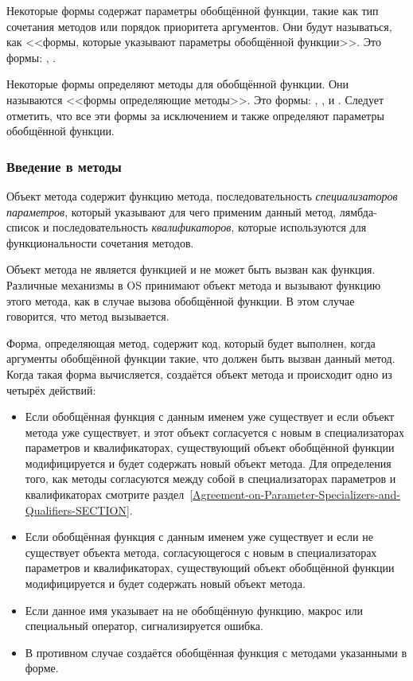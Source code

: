 Некоторые формы содержат параметры обобщённой функции, такие как тип сочетания
методов или порядок приоритета аргументов. Они будут называться, как <<формы,
которые указывают параметры обобщённой функции>>. Это формы: ,
.

Некоторые формы определяют методы для обобщённой функции. Они называются <<формы
определяющие методы>>. Это формы: , ,
 и . Следует отметить, что все эти формы за
исключением  и  также определяют параметры
обобщённой функции.

\subsubsection{Введение в методы}
\label{Introduction-to-Methods-SECTION}

Объект метода содержит функцию метода, последовательность \emph{специализаторов
  параметров}, который указывают для чего применим данный метод, лямбда-список и
последовательность \emph{квалификаторов}, которые используются для функциональности
сочетания методов.

Объект метода не является функцией и не может быть вызван как функция. Различные
механизмы в OS принимают объект метода и вызывают функцию этого метода, как в
случае вызова обобщённой функции. В этом случае говорится, что метод вызывается.

Форма, определяющая метод, содержит код, который будет выполнен, когда аргументы
обобщённой функции такие, что должен быть вызван данный метод. Когда такая форма
вычисляется, создаётся объект метода и происходит одно из четырёх действий:

\begin{itemize}
\item Если обобщённая функция с данным именем уже существует и если объект
  метода уже существует, и этот объект согласуется с новым в специализаторах
  параметров и квалификаторах, существующий объект обобщённой функции
  модифицируется и будет содержать новый объект метода. Для определения того,
  как методы согласуются между собой в специализаторах параметров и
  квалификаторах смотрите
  раздел~\ref{Agreement-on-Parameter-Specializers-and-Qualifiers-SECTION}.

\item Если обобщённая функция с данным именем уже существует и если не
  существует объекта метода, согласующегося с новым в специализаторах
  параметров и квалификаторах, существующий объект обобщённой функции
  модифицируется и будет содержать новый объект метода.
\item Если данное имя указывает на не обобщённую функцию, макрос или специальный
  оператор, сигнализируется ошибка.

\item В противном случае создаётся обобщённая функция с методами указанными в
  форме.
\end{itemize}

